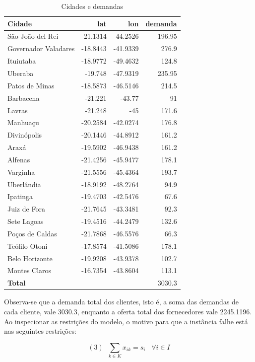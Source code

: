 \documentclass[a4paper,11pt]{article}
\begin{document}
\begin{table}[ht]
\centering
\begin{tabular}{lrrr}
\hline
\textbf{Cidade} & \textbf{lat} & \textbf{lon} & \textbf{demanda} \\
\hline
São João del-Rei & -21.1314 & -44.2526 & 196.95 \\
Governador Valadares & -18.8443 & -41.9339 & 276.9 \\
Ituiutaba & -18.9772 & -49.4632 & 124.8 \\
Uberaba & -19.748 & -47.9319 & 235.95 \\
Patos de Minas & -18.5873 & -46.5146 & 214.5 \\
Barbacena & -21.221 & -43.77 & 91 \\
Lavras & -21.248 & -45 & 171.6 \\
Manhuaçu & -20.2584 & -42.0274 & 176.8 \\
Divinópolis & -20.1446 & -44.8912 & 161.2 \\
Araxá & -19.5902 & -46.9438 & 161.2 \\
Alfenas & -21.4256 & -45.9477 & 178.1 \\
Varginha & -21.5556 & -45.4364 & 193.7 \\
Uberlândia & -18.9192 & -48.2764 & 94.9 \\
Ipatinga & -19.4703 & -42.5476 & 67.6 \\
Juiz de Fora & -21.7645 & -43.3481 & 92.3 \\
Sete Lagoas & -19.4516 & -44.2479 & 132.6 \\
Poços de Caldas & -21.7868 & -46.5576 & 66.3 \\
Teófilo Otoni & -17.8574 & -41.5086 & 178.1 \\
Belo Horizonte & -19.9208 & -43.9378 & 102.7 \\
Montes Claros & -16.7354 & -43.8604 & 113.1 \\
\textbf{Total} & & & 3030.3 \\
\hline
\end{tabular}
\caption{Cidades e demandas}
\label{tab:dados_cidades}
\end{table}

\newpage
Observa-se que a demanda total dos clientes, isto é, a soma das demandas de cada cliente, vale 3030.3, enquanto a oferta total dos fornecedores vale 2245.1196. Ao inspecionar as restrições do modelo, o motivo para que a instância falhe está nas seguintes restrições:

\[
(3) \; \; \sum_{k \in K} x_{ik} = s_i \; \; \; \forall i \in I
\]
\end{document}
